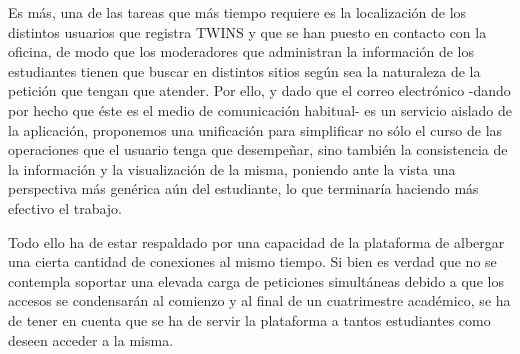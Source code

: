 Es más, una de las tareas que más tiempo requiere es la localización de los distintos usuarios que registra TWINS y que se han puesto en contacto con la oficina, de modo que los moderadores que administran la información de los estudiantes tienen que buscar en distintos sitios según sea la naturaleza de la petición que tengan que atender. Por ello, y dado que el correo electrónico -dando por hecho que éste es el medio de comunicación habitual- es un servicio aislado de la aplicación, proponemos una unificación para simplificar no sólo el curso de las operaciones que el usuario tenga que desempeñar, sino  también la consistencia de la información y la visualización de la misma, poniendo ante la vista una perspectiva más genérica aún del estudiante, lo que terminaría haciendo más efectivo el trabajo.


Todo ello ha de estar respaldado por una capacidad de la plataforma de albergar una cierta cantidad de conexiones al mismo tiempo. Si bien es verdad que no se contempla soportar una elevada carga de peticiones simultáneas debido a que los accesos se condensarán al comienzo y al final de un cuatrimestre académico, se ha de tener en cuenta que se ha de servir la plataforma a tantos estudiantes como deseen acceder a la misma.